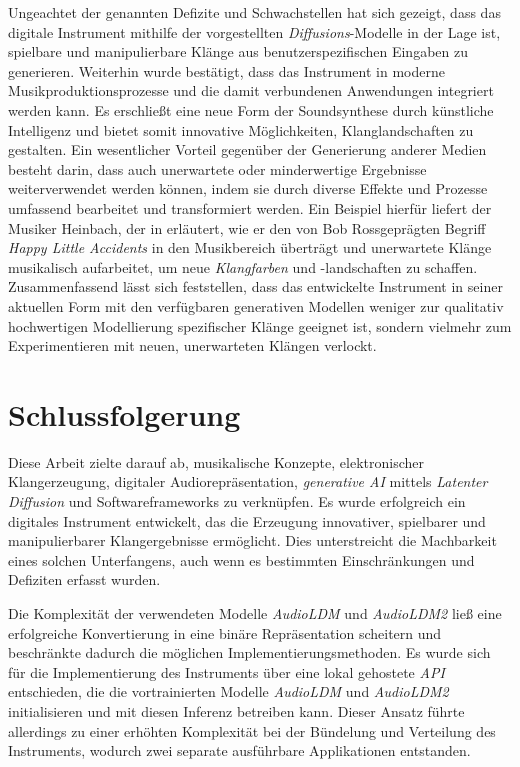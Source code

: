 \documentclass[
  a4paper,  %
  twoside,  %
  bibliography=totoc,
  headsepline,
  cleardoublepage=empty,
  parskip=half,
  draft=false
]{scrbook}
\begin{document}
Ungeachtet der genannten Defizite und Schwachstellen hat sich gezeigt, dass das digitale Instrument mithilfe der vorgestellten \emph{Diffusions}-Modelle in der Lage ist, spielbare und manipulierbare Klänge aus benutzerspezifischen Eingaben zu generieren. Weiterhin wurde bestätigt, dass das Instrument in moderne Musikproduktionsprozesse und die damit verbundenen Anwendungen integriert werden kann. Es erschließt eine neue Form der Soundsynthese durch künstliche Intelligenz und bietet somit innovative Möglichkeiten, Klanglandschaften zu gestalten. Ein wesentlicher Vorteil gegenüber der Generierung anderer Medien besteht darin, dass auch unerwartete oder minderwertige Ergebnisse weiterverwendet werden können, indem sie durch diverse Effekte und Prozesse umfassend bearbeitet und transformiert werden. Ein Beispiel hierfür liefert der Musiker \glqq Heinbach\grqq, der in \cite{hainbach_how_2021} erläutert, wie er den von \glqq Bob Ross\grqq geprägten Begriff \emph{Happy Little Accidents} in den Musikbereich überträgt und unerwartete Klänge musikalisch aufarbeitet, um neue \emph{Klangfarben} und -landschaften zu schaffen. Zusammenfassend lässt sich feststellen, dass das entwickelte Instrument in seiner aktuellen Form mit den verfügbaren generativen Modellen weniger zur qualitativ hochwertigen Modellierung spezifischer Klänge geeignet ist, sondern vielmehr zum Experimentieren mit neuen, unerwarteten Klängen verlockt.

\chapter{Schlussfolgerung}
Diese Arbeit zielte darauf ab, musikalische Konzepte, elektronischer Klangerzeugung, digitaler Audiorepräsentation, \emph{generative AI} mittels \emph{Latenter Diffusion} und Softwareframeworks zu verknüpfen. Es wurde erfolgreich ein digitales Instrument entwickelt, das die Erzeugung innovativer, spielbarer und manipulierbarer Klangergebnisse ermöglicht. Dies unterstreicht die Machbarkeit eines solchen Unterfangens, auch wenn es bestimmten Einschränkungen und Defiziten erfasst wurden.

Die Komplexität der verwendeten Modelle \emph{AudioLDM} \cite{liu_audioldm_2023} und \emph{AudioLDM2} \cite{liu_audioldm2_2023} ließ eine erfolgreiche Konvertierung in eine binäre Repräsentation scheitern und beschränkte dadurch die möglichen Implementierungsmethoden. Es wurde sich für die Implementierung des Instruments über eine lokal gehostete \emph{API} entschieden, die die vortrainierten Modelle \emph{AudioLDM} und \emph{AudioLDM2} initialisieren und mit diesen Inferenz betreiben kann. Dieser Ansatz führte allerdings zu einer erhöhten Komplexität bei der Bündelung und Verteilung des Instruments, wodurch zwei separate ausführbare Applikationen entstanden.
\end{document}
